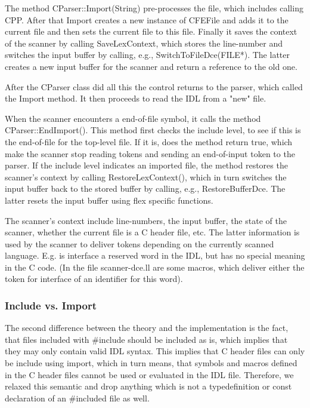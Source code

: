 The method CParser::Import(String) pre-processes the file, which
includes calling CPP. After that Import creates a new instance of
CFEFile and adds it to the current file and then sets the current file
to this file. Finally it saves the context of the scanner by calling
SaveLexContext, which stores the line-number and switches the input
buffer by calling, e.g., SwitchToFileDce(FILE*). The latter creates a
new input buffer for the scanner and return a reference to the old
one.

After the CParser class did all this the control returns to the
parser, which called the Import method. It then proceeds to read the
IDL from a "new" file.

When the scanner encounters a end-of-file symbol, it calls the method
CParser::EndImport(). This method first checks the include level, to
see if this is the end-of-file for the top-level file. If it is, does
the method return true, which make the scanner stop reading tokens and
sending an end-of-input token to the parser. If the include level
indicates an imported file, the method restores the scanner's context
by calling RestoreLexContext(), which in turn switches the input
buffer back to the stored buffer by calling, e.g.,
RestoreBufferDce. The latter resets the input buffer using flex
specific functions.

The scanner's context include line-numbers, the input buffer, the
state of the scanner, whether the current file is a C header file,
etc. The latter information is used by the scanner to deliver tokens
depending on the currently scanned language. E.g. is interface a
reserved word in the IDL, but has no special meaning in the C
code. (In the file scanner-dce.ll are some macros, which deliver
either the token for interface of an identifier for this word).

\subsubsection{Include vs. Import}
The second difference between the theory and the implementation is the
fact, that files included with #include should be included as is,
which implies that they may only contain valid IDL syntax. This
implies that C header files can only be include using import, which in
turn means, that symbols and macros defined in the C header files
cannot be used or evaluated in the IDL file. Therefore, we relaxed
this semantic and drop anything which is not a typedefinition or const
declaration of an #included file as well.

